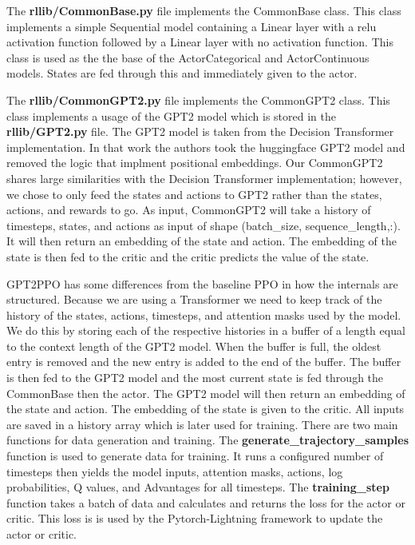 The \textbf{rllib/CommonBase.py} file implements the CommonBase class. This class implements a simple Sequential model containing a 
Linear layer with a relu activation function followed by a Linear layer with no activation function. This class is used as the
the base of the ActorCategorical and ActorContinuous models. States are fed through this and immediately given to the actor. 

The \textbf{rllib/CommonGPT2.py} file implements the CommonGPT2 class. This class implements a usage of the GPT2 model which is stored 
in the \textbf{rllib/GPT2.py} file. The GPT2 model is taken from the Decision Transformer implementation\cite{chen2021decision}. In that work
the authors took the huggingface GPT2 model and removed the logic that implment positional embeddings\cite{radford2019language,wolf-etal-2020-transformers}.
Our CommonGPT2 shares large similarities with the Decision Transformer implementation\cite{chen2021decision}; however, we chose to only 
feed the states and actions to GPT2 rather than the states, actions, and rewards to go. As input, CommonGPT2 will take a history of timesteps, states, 
and actions as input of shape (batch\_size, sequence\_length,:). It will then return an embedding of the state and action. The embedding of the 
state is then fed to the critic and the critic predicts the value of the state. 

GPT2PPO has some differences from the baseline PPO in how the internals are structured. Because we are using a Transformer we need to keep track of the 
history of the states, actions, timesteps, and attention masks used by the model. We do this by storing each of the respective histories in a buffer
of a length equal to the context length of the GPT2 model. When the buffer is full, the oldest entry is removed and the new entry is added to the end 
of the buffer. The buffer is then fed to the GPT2 model and the most current state is fed through the CommonBase then the actor. The GPT2 model will 
then return an embedding of the state and action. The embedding of the state is given to the critic. All inputs are saved in a history array which is 
later used for training.
There are two main functions for data generation and training. The \textbf{generate\_trajectory\_samples} function is used to generate data for training.
It runs a configured number of timesteps then yields the model inputs, attention masks, actions, log probabilities, Q values, and Advantages for
all timesteps. The \textbf{training\_step} function takes a batch of data and calculates and returns the loss for the actor or critic. This loss is 
is used by the Pytorch-Lightning framework to update the actor or critic.

